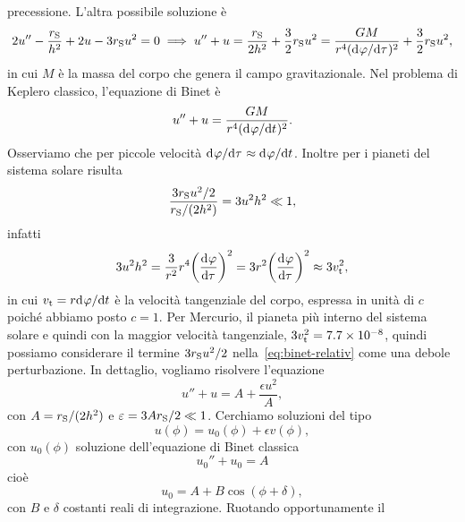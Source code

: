 precessione.  L'altra possibile soluzione è
\begin{equation}
  \label{eq:binet-relativ}
  2u'' - \frac{r_{\textup{S}}}{h^{2}} + 2u - 3r_{\textup{S}}u^{2} = 0 \implies
  u'' + u = \frac{r_{\textup{S}}}{2h^{2}} + \frac{3}{2}r_{\textup{S}}u^{2} =
  \frac{GM}{r^{4}(\ltoder{\phi}{\tau})^{2}} + \frac{3}{2}r_{\textup{S}}u^{2},
\end{equation}
in cui $M$ è la massa del corpo che genera il campo gravitazionale.  Nel
problema di Keplero classico, l'equazione di Binet è
\begin{equation}
  \label{eq:binet}
  u'' + u = \frac{GM}{r^{4}(\ltoder{\phi}{t})^{2}}.
\end{equation}
Osserviamo che per piccole velocità
$\ltoder{\phi}{\tau} \approx \ltoder{\phi}{t}$.  Inoltre per i pianeti del
sistema solare risulta
\begin{equation}
  \frac{3r_{\textup{S}}u^{2}/2}{r_{\textup{S}}/(2h^{2})} = 3u^{2}h^{2} \ll 1,
\end{equation}
infatti
\begin{equation}
  3u^{2}h^{2} = \frac{3}{r^{2}}r^{4} \bigg(\toder{\phi}{\tau}\bigg)^{2} = 3r^{2}
  \bigg(\toder{\phi}{\tau}\bigg)^{2} \approx 3 v_{\textup{t}}^{2},
\end{equation}
in cui $v_{\textup{t}} = r\ltoder{\phi}{t}$ è la velocità tangenziale del corpo,
espressa in unità di $c$ poiché abbiamo posto $c = 1$.  Per Mercurio, il pianeta
più interno del sistema solare e quindi con la maggior velocità tangenziale,
$3 v_{\textup{t}}^{2} = \num{7.7e-8}$, quindi possiamo considerare il termine
$3r_{\textup{S}}u^{2}/2$ nella~\eqref{eq:binet-relativ} come una debole
perturbazione.  In dettaglio, vogliamo risolvere l'equazione
\begin{equation}
  u'' + u = A + \frac{\epsilon u^{2}}{A},
\end{equation}
con $A = r_{\textup{S}}/(2h^{2})$ e $\epsilon = 3Ar_{\textup{S}}/2  \ll 1$.
Cerchiamo soluzioni del tipo
\begin{equation}
  u(\phi) = u_{0}(\phi) + \epsilon v(\phi),
\end{equation}
con $u_{0}(\phi)$ soluzione dell'equazione di Binet classica
\begin{equation}
  \label{eq:binet-2}
  u_{0}'' + u_{0} = A
\end{equation}
cioè
\begin{equation}
  u_{0} = A + B\cos(\phi + \delta),
\end{equation}
con $B$ e $\delta$ costanti reali di integrazione.  Ruotando opportunamente il
